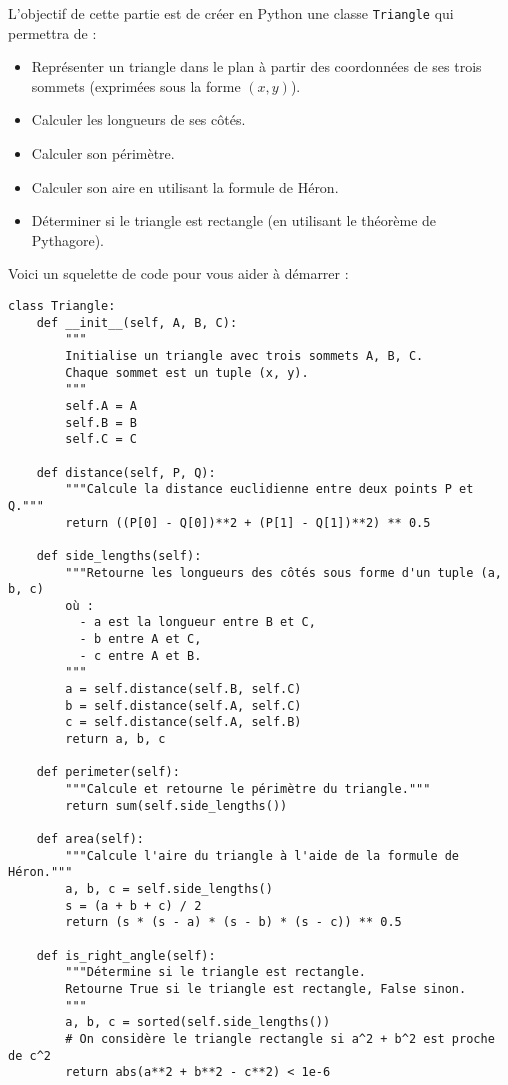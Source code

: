 \documentclass[a4paper,12pt]{article}
\theoremstyle{definition}
\begin{document}
\bigskip


L'objectif de cette partie est de créer en Python une classe \texttt{Triangle} qui permettra de :
\begin{itemize}
  \item Représenter un triangle dans le plan à partir des coordonnées de ses trois sommets (exprimées sous la forme \((x,y)\)).
  \item Calculer les longueurs de ses côtés.
  \item Calculer son périmètre.
  \item Calculer son aire en utilisant la formule de Héron.
  \item Déterminer si le triangle est rectangle (en utilisant le théorème de Pythagore).
\end{itemize}

Voici un squelette de code pour vous aider à démarrer :

\begin{verbatim}
class Triangle:
    def __init__(self, A, B, C):
        """
        Initialise un triangle avec trois sommets A, B, C.
        Chaque sommet est un tuple (x, y).
        """
        self.A = A
        self.B = B
        self.C = C

    def distance(self, P, Q):
        """Calcule la distance euclidienne entre deux points P et Q."""
        return ((P[0] - Q[0])**2 + (P[1] - Q[1])**2) ** 0.5

    def side_lengths(self):
        """Retourne les longueurs des côtés sous forme d'un tuple (a, b, c)
        où :
          - a est la longueur entre B et C,
          - b entre A et C,
          - c entre A et B.
        """
        a = self.distance(self.B, self.C)
        b = self.distance(self.A, self.C)
        c = self.distance(self.A, self.B)
        return a, b, c

    def perimeter(self):
        """Calcule et retourne le périmètre du triangle."""
        return sum(self.side_lengths())

    def area(self):
        """Calcule l'aire du triangle à l'aide de la formule de Héron."""
        a, b, c = self.side_lengths()
        s = (a + b + c) / 2
        return (s * (s - a) * (s - b) * (s - c)) ** 0.5

    def is_right_angle(self):
        """Détermine si le triangle est rectangle.
        Retourne True si le triangle est rectangle, False sinon.
        """
        a, b, c = sorted(self.side_lengths())
        # On considère le triangle rectangle si a^2 + b^2 est proche de c^2
        return abs(a**2 + b**2 - c**2) < 1e-6
\end{verbatim}
\end{document}

